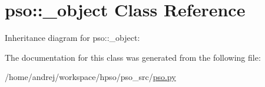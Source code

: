 \hypertarget{classpso_1_1__object}{
\section{pso::\_\-object Class Reference}
\label{classpso_1_1__object}
}
Inheritance diagram for pso::\_\-object:

The documentation for this class was generated from the following file:\begin{CompactItemize}
\item 
/home/andrej/workspace/hpso/pso\_\-src/\hyperlink{pso_8py}{pso.py}\end{CompactItemize}
